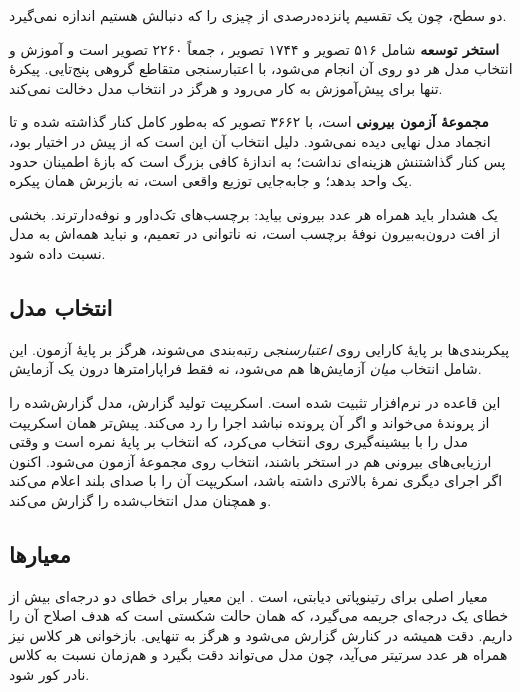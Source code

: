 دو سطح، چون یک تقسیم پانزده‌درصدی از  چیزی را که دنبالش هستیم اندازه نمی‌گیرد.

\textbf{استخر توسعه} شامل \num{۵۱۶} تصویر  و \num{۱۷۴۴} تصویر ، جمعاً \num{۲۲۶۰} تصویر
است و آموزش و انتخاب مدل هر دو روی آن انجام می‌شود، با اعتبارسنجی متقاطع گروهی پنج‌تایی.
پیکرهٔ  تنها برای پیش‌آموزش به کار می‌رود و هرگز در انتخاب مدل دخالت نمی‌کند.

\textbf{مجموعهٔ آزمون بیرونی}  \cite{aptos2019} است، با \num{۳۶۶۲} تصویر که به‌طور کامل کنار گذاشته
شده و تا انجماد مدل نهایی دیده نمی‌شود. دلیل انتخاب آن این است که از پیش در اختیار بود، پس
کنار گذاشتنش هزینه‌ای نداشت؛ به اندازهٔ کافی بزرگ است که بازهٔ اطمینان حدود یک واحد بدهد؛ و
جابه‌جایی توزیع واقعی است، نه بازبرش همان پیکره.

یک هشدار باید همراه هر عدد بیرونی بیاید: برچسب‌های  تک‌داور و نوفه‌دارترند. بخشی از
افت درون‌به‌بیرون نوفهٔ برچسب است، نه ناتوانی در تعمیم، و نباید همه‌اش به مدل نسبت داده شود.

\subsection{انتخاب مدل}

پیکربندی‌ها بر پایهٔ کارایی روی \emph{اعتبارسنجی} رتبه‌بندی می‌شوند، هرگز بر پایهٔ آزمون. این
شامل انتخاب \emph{میان} آزمایش‌ها هم می‌شود، نه فقط فراپارامترها درون یک آزمایش.

این قاعده در نرم‌افزار تثبیت شده است. اسکریپت تولید گزارش، مدل گزارش‌شده را از پروندهٔ
 می‌خواند و اگر آن پرونده نباشد اجرا را رد می‌کند. پیش‌تر همان
اسکریپت مدل را با بیشینه‌گیری روی  انتخاب می‌کرد، که انتخاب بر پایهٔ نمره است و وقتی
ارزیابی‌های بیرونی هم در استخر باشند، انتخاب روی مجموعهٔ آزمون می‌شود. اکنون اگر اجرای دیگری
نمرهٔ بالاتری داشته باشد، اسکریپت آن را با صدای بلند اعلام می‌کند و همچنان مدل انتخاب‌شده را
گزارش می‌کند.

\subsection{معیارها}

معیار اصلی برای رتینوپاتی دیابتی،  است \cite{cohen1968kappa}. این معیار برای خطای دو درجه‌ای بیش از خطای یک
درجه‌ای جریمه می‌گیرد، که همان حالت شکستی است که هدف اصلاح آن را داریم. دقت همیشه در کنارش
گزارش می‌شود و هرگز به تنهایی. بازخوانی هر کلاس نیز همراه هر عدد سرتیتر می‌آید، چون مدل
می‌تواند دقت بگیرد و هم‌زمان نسبت به کلاس نادر کور شود.

